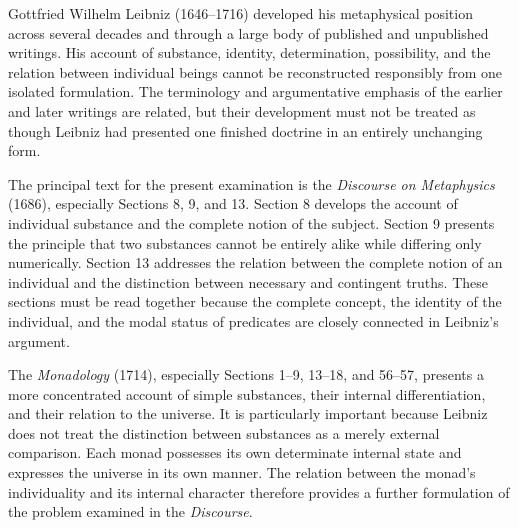 \label{para:VS.B01.P01.C08.S07.SS02.P001}

Gottfried Wilhelm Leibniz (1646--1716) developed his
metaphysical position across several decades and through
a large body of published and unpublished writings.
His account of substance, identity, determination,
possibility, and the relation between individual beings
cannot be reconstructed responsibly from one isolated
formulation. The terminology and argumentative emphasis
of the earlier and later writings are related, but
their development must not be treated as though Leibniz
had presented one finished doctrine in an entirely
unchanging form. \cite{LookLeibnizSEP2020}

\label{para:VS.B01.P01.C08.S07.SS02.P002}

The principal text for the present examination is the
\textit{Discourse on Metaphysics} (1686), especially
Sections 8, 9, and 13. Section 8 develops the account
of individual substance and the complete notion of
the subject. Section 9 presents the principle that
two substances cannot be entirely alike while differing
only numerically. Section 13 addresses the relation
between the complete notion of an individual and the
distinction between necessary and contingent truths.
These sections must be read together because the
complete concept, the identity of the individual,
and the modal status of predicates are closely
connected in Leibniz's argument. \cite[§§8--9, 13]{LeibnizDiscourse}

\label{para:VS.B01.P01.C08.S07.SS02.P003}

The \textit{Monadology} (1714), especially Sections
1--9, 13--18, and 56--57, presents a more concentrated
account of simple substances, their internal
differentiation, and their relation to the universe.
It is particularly important because Leibniz does not
treat the distinction between substances as a merely
external comparison. Each monad possesses its own
determinate internal state and expresses the universe
in its own manner. The relation between the monad's
individuality and its internal character therefore
provides a further formulation of the problem examined
in the \textit{Discourse}. \cite[§§1--9, 13--18, 56--57]{LeibnizMonadology}

\label{para:VS.B01.P01.C08.S07.SS02.P004}

